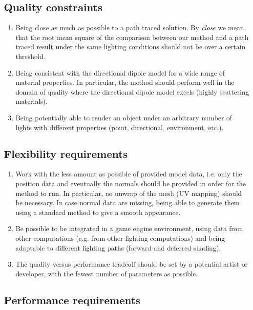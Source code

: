\subsection{Quality constraints}
 \label{sec:quality}
\begin{enumerate}
	\item Being close as much as possible to a path traced solution. By \emph{close} we mean that the root mean square of the comparison between our method and a path traced result under the same lighting conditions should not be over a certain threshold. 
	\item Being consistent with the directional dipole model for a wide range of material properties. In particular, the method should perform well in the domain of quality where the directional dipole model excels (highly scattering materials).
	\item Being potentially able to render an object under an arbitrary number of lights with different properties (point, directional, environment, etc.).
\end{enumerate}

\subsection{Flexibility requirements}	
\begin{enumerate}
	\item Work with the less amount as possible of provided model data, i.e. only the position data and eventually the normals should be provided in order for the method to run. In particular, no unwrap of the mesh (UV mapping) should be necessary. In case normal data are missing,  being able to generate them using a standard method to give a smooth appearance.
	\item Be possible to be integrated in a game engine environment, using data from other computations (e.g. from other lighting computations) and being adaptable to different lighting paths (forward and deferred shading).
  \item The quality versus performance tradeoff should be set by a potential artist or developer, with the fewest number of parameters as possible.
\end{enumerate}

\subsection{Performance requirements}

